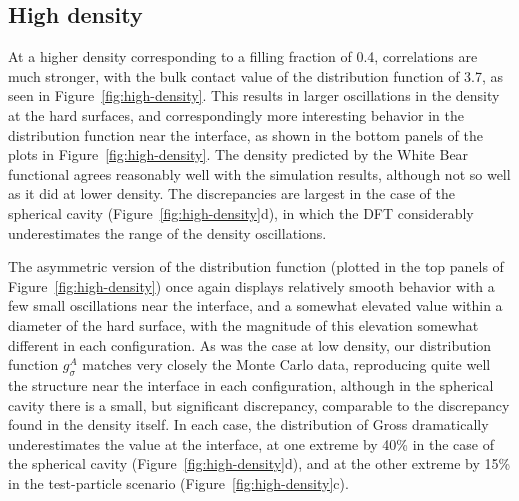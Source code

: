 \subsection{High density}

At a higher density corresponding to a filling fraction of 0.4,
correlations are much stronger, with the bulk contact value of the
distribution function of 3.7, as seen in Figure~\ref{fig:high-density}.
This results in larger oscillations in the density at the hard
surfaces, and correspondingly more interesting behavior in the
distribution function near the interface, as shown in the bottom panels
of the plots in Figure~\ref{fig:high-density}.  The density predicted
by the White Bear functional agrees reasonably well with the
simulation results, although not so well as it did at lower density.
The discrepancies are largest in the case of the spherical cavity
(Figure~\ref{fig:high-density}d), in which the DFT considerably
underestimates the range of the density oscillations.

The asymmetric version of the distribution function (plotted in the
top panels of Figure~\ref{fig:high-density}) once again displays
relatively smooth behavior with a few small oscillations near the
interface, and a somewhat elevated value within a diameter of the hard
surface, with the magnitude of this elevation somewhat different in
each configuration.  As was the case at low density, our distribution
function $g_\sigma^A$ matches very closely the Monte Carlo data,
reproducing quite well the structure near the interface in each
configuration, although in the spherical cavity there is a small, but
significant discrepancy, comparable to the discrepancy found in the
density itself.  In each case, the distribution of Gross dramatically
underestimates the value at the interface, at one extreme by 40\% in
the case of the spherical cavity (Figure~\ref{fig:high-density}d), and
at the other extreme by 15\% in the test-particle scenario
(Figure~\ref{fig:high-density}c).


